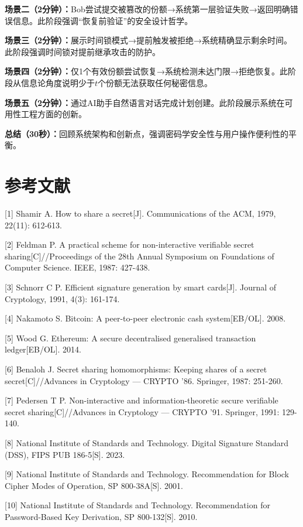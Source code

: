 \documentclass[UTF8,a4paper,zihao=-4,openany]{ctexrep}
\begin{document}
\textbf{场景二（2分钟）：}Bob尝试提交被篡改的份额→系统第一层验证失败→返回明确错误信息。此阶段强调“恢复前验证”的安全设计哲学。

\textbf{场景三（2分钟）：}展示时间锁模式→提前触发被拒绝→系统精确显示剩余时间。此阶段强调时间锁对提前继承攻击的防护。

\textbf{场景四（2分钟）：}仅1个有效份额尝试恢复→系统检测未达门限→拒绝恢复。此阶段从信息论角度说明少于$t$个份额无法获取任何秘密信息。

\textbf{场景五（2分钟）：}通过AI助手自然语言对话完成计划创建。此阶段展示系统在可用性工程方面的创新。

\textbf{总结（30秒）：}回顾系统架构和创新点，强调密码学安全性与用户操作便利性的平衡。

\chapter*{参考文献}

[1] Shamir A. How to share a secret[J]. Communications of the ACM, 1979, 22(11): 612-613.

[2] Feldman P. A practical scheme for non-interactive verifiable secret sharing[C]//Proceedings of the 28th Annual Symposium on Foundations of Computer Science. IEEE, 1987: 427-438.

[3] Schnorr C P. Efficient signature generation by smart cards[J]. Journal of Cryptology, 1991, 4(3): 161-174.

[4] Nakamoto S. Bitcoin: A peer-to-peer electronic cash system[EB/OL]. 2008.

[5] Wood G. Ethereum: A secure decentralised generalised transaction ledger[EB/OL]. 2014.

[6] Benaloh J. Secret sharing homomorphisms: Keeping shares of a secret secret[C]//Advances in Cryptology — CRYPTO '86. Springer, 1987: 251-260.

[7] Pedersen T P. Non-interactive and information-theoretic secure verifiable secret sharing[C]//Advances in Cryptology — CRYPTO '91. Springer, 1991: 129-140.

[8] National Institute of Standards and Technology. Digital Signature Standard (DSS), FIPS PUB 186-5[S]. 2023.

[9] National Institute of Standards and Technology. Recommendation for Block Cipher Modes of Operation, SP 800-38A[S]. 2001.

[10] National Institute of Standards and Technology. Recommendation for Password-Based Key Derivation, SP 800-132[S]. 2010.
\end{document}
